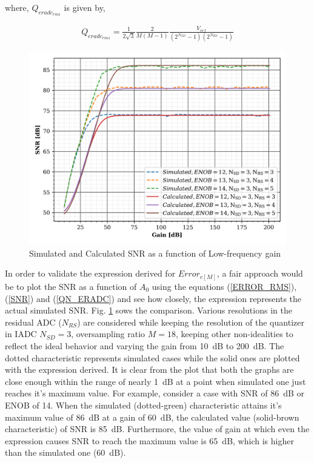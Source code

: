 where, $Q_{eradc_{rms}}$ is given by,

 \begin{align}\label{QN_ERADC}
     Q_{eradc_{rms}}=\frac{1}{2\sqrt{3}}\frac{2}{M(M-1)}\frac{V_{ref}}{\left(2^{N_{SD}}-1\right)\left(2^{N_{RS}}-1\right)}
 \end{align}


\begin{figure}
    \centering
    \includegraphics[scale=.7]{Chap04/Figures/snr_vs_gain_sim_calc}
    \caption{Simulated and Calculated SNR as a function of Low-frequency gain}
    \label{fig:SNR_G_calc}
\end{figure}

In order to validate the expression derived for $Error_{e[M]}$, a fair approach would be to plot the SNR as a function of $A_0$ using the equations (\ref{ERROR_RMS}), (\ref{SNR}) and (\ref{QN_ERADC}) and see how closely, the expression represents the actual simulated SNR. Fig. \ref{fig:SNR_G_calc} sows the comparison. Various resolutions in the residual ADC ($N_{RS}$) are considered while keeping the resolution of the quantizer in IADC $N_{SD} = 3$, oversampling ratio $M = 18$, keeping other non-idealities to reflect the ideal behavior and varying the gain from 10~dB to 200~dB. The dotted characteristic represents simulated cases while the solid ones are plotted with the expression derived. It is clear from the plot that both the graphs are close enough within the range of nearly 1~dB at a point when simulated one just reaches it's maximum value. For example, consider a case with SNR of 86~dB or ENOB of 14. When the simulated (dotted-green) characteristic attains it's maximum value of 86~dB at a gain of 60~dB, the calculated value (solid-brown characteristic) of SNR is 85~dB. Furthermore, the value of gain at which even the expression causes SNR to reach the maximum value is 65~dB, which is higher than the simulated one (60~dB).

